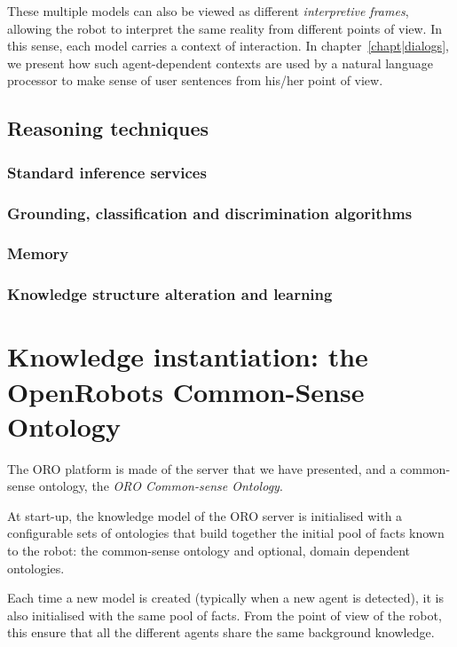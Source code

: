 These multiple models can also be viewed as different \emph{interpretive
frames}, allowing the robot to interpret the same reality from different points
of view. In this sense, each model carries a context of interaction.  In
chapter~\ref{chapt|dialogs}, we present how such agent-dependent contexts are
used by a natural language processor to make sense of user sentences from
his/her point of view.

\subsection{Reasoning techniques}

\subsubsection{Standard inference services}
\subsubsection{Grounding, classification and discrimination algorithms}
\subsubsection{Memory}
\subsubsection{Knowledge structure alteration and learning}



\section{Knowledge instantiation: the OpenRobots Common-Sense Ontology}
\label{sect|oro-commonsense}

The ORO platform is made of the server that we have presented, and a
common-sense ontology, the \emph{ORO Common-sense Ontology}.

At start-up, the knowledge model of the ORO server is initialised with a
configurable sets of ontologies that build together the initial pool of facts
known to the robot: the common-sense ontology and optional, domain dependent
ontologies.

Each time a new model is created (typically when a new agent is detected), it
is also initialised with the same pool of facts.  From the point of view of the
robot, this ensure that all the different agents share the same background
knowledge.

